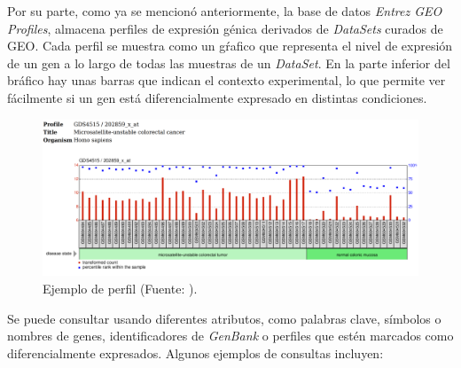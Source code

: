 Por su parte, como ya se mencionó anteriormente, la base de datos \textit{Entrez GEO Profiles}, almacena perfiles de expresión génica derivados de \textit{DataSets} curados de GEO.
Cada perfil se muestra como un gŕafico que representa el nivel de expresión de un gen a lo largo de todas las muestras de un \textit{DataSet}. En la parte inferior del bráfico hay unas
barras que indican el contexto experimental, lo que permite ver fácilmente si un gen está diferencialmente expresado en distintas condiciones. \newline

\begin{figure}[h]
    \centering
    \includegraphics[width=1\textwidth]{../img/geo-profile.png}
    \caption{Ejemplo de perfil (Fuente: ).}  %
\end{figure}

Se puede consultar usando diferentes atributos, como palabras clave, símbolos o nombres de genes, identificadores de \textit{GenBank} o perfiles que estén marcados como diferencialmente expresados.
Algunos ejemplos de consultas incluyen:

